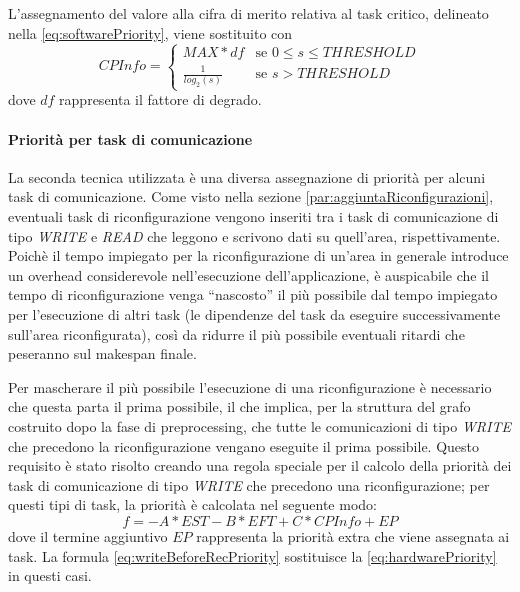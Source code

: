 L'assegnamento del valore alla cifra di merito relativa al task critico, 
delineato nella \ref{eq:softwarePriority}, viene sostituito con
\begin{equation} \label{eq:newSoftwarePriority}
 CPInfo = \begin{cases}
           MAX*df & \mbox{se } 0 \leq s \leq THRESHOLD\\
           \frac{1}{log_2\left(s\right)} & \mbox{se } s > THRESHOLD
           \end{cases}
\end{equation}
dove $df$ rappresenta il fattore di degrado.

\paragraph{Priorità per task di comunicazione}
La seconda tecnica utilizzata è una diversa assegnazione di priorità per alcuni 
task di comunicazione. Come visto nella sezione 
\ref{par:aggiuntaRiconfigurazioni}, eventuali task di riconfigurazione vengono 
inseriti tra i task di comunicazione di tipo \emph{WRITE} e \emph{READ} che 
leggono e scrivono dati su quell'area, rispettivamente. Poichè il tempo 
impiegato per la riconfigurazione di un'area in generale introduce un 
overhead considerevole nell'esecuzione dell'applicazione, è auspicabile che 
il tempo di riconfigurazione venga ``nascosto'' il più possibile dal tempo 
impiegato per l'esecuzione di altri task (le dipendenze del task da eseguire 
successivamente sull'area riconfigurata), così da ridurre il più possibile eventuali
ritardi che peseranno sul makespan finale.

Per mascherare il più possibile l'esecuzione di una riconfigurazione è 
necessario che questa parta il prima possibile, il che implica, per la 
struttura del grafo costruito dopo la fase di preprocessing, che tutte le 
comunicazioni di tipo \emph{WRITE} che precedono la riconfigurazione vengano 
eseguite il prima possibile. Questo requisito è stato risolto creando una 
regola speciale per il calcolo della priorità dei task di comunicazione di tipo 
\emph{WRITE} che precedono una riconfigurazione; per questi tipi di task, la 
priorità è calcolata nel seguente modo:
\begin{equation} \label{eq:writeBeforeRecPriority}
 f=-A*EST - B*EFT + C*CPInfo + EP
\end{equation}
dove il termine aggiuntivo $EP$ rappresenta la priorità extra che viene 
assegnata ai task. La formula \ref{eq:writeBeforeRecPriority} sostituisce la 
\ref{eq:hardwarePriority} in questi casi.


